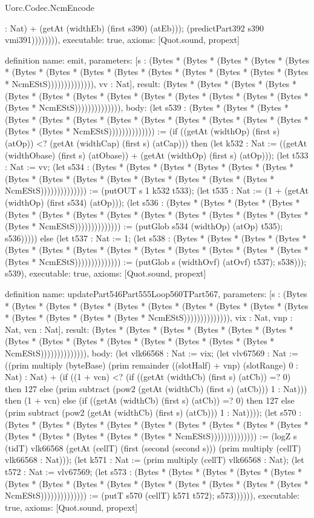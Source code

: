 \begin{lexlean}{Uorc.Codec.NcmEncode}
\begin{semanticmodule}
{: Nat) + (getAt (widthEb) (first s390) (atEb))); (predictPart392 s390 vmi391)))))))),
  executable: true,
  axioms: [Quot.sound, propext]
}

definition{
  name: emit,
  parameters: [s : (Bytes * (Bytes * (Bytes * (Bytes * (Bytes * (Bytes * (Bytes * (Bytes * (Bytes * (Bytes * (Bytes * (Bytes * (Bytes * (Bytes * NcmEStS)))))))))))))), vv : Nat],
  result: (Bytes * (Bytes * (Bytes * (Bytes * (Bytes * (Bytes * (Bytes * (Bytes * (Bytes * (Bytes * (Bytes * (Bytes * (Bytes * (Bytes * NcmEStS)))))))))))))),
  body: (let s539 : (Bytes * (Bytes * (Bytes * (Bytes * (Bytes * (Bytes * (Bytes * (Bytes * (Bytes * (Bytes * (Bytes * (Bytes * (Bytes * (Bytes * NcmEStS)))))))))))))) := (if ((getAt (widthOp) (first s) (atOp)) <? (getAt (widthCap) (first s) (atCap))) then (let k532 : Nat := ((getAt (widthObase) (first s) (atObase)) + (getAt (widthOp) (first s) (atOp))); (let t533 : Nat := vv; (let s534 : (Bytes * (Bytes * (Bytes * (Bytes * (Bytes * (Bytes * (Bytes * (Bytes * (Bytes * (Bytes * (Bytes * (Bytes * (Bytes * (Bytes * NcmEStS)))))))))))))) := (putOUT s 1 k532 t533); (let t535 : Nat := (1 + (getAt (widthOp) (first s534) (atOp))); (let s536 : (Bytes * (Bytes * (Bytes * (Bytes * (Bytes * (Bytes * (Bytes * (Bytes * (Bytes * (Bytes * (Bytes * (Bytes * (Bytes * (Bytes * NcmEStS)))))))))))))) := (putGlob s534 (widthOp) (atOp) t535); s536))))) else (let t537 : Nat := 1; (let s538 : (Bytes * (Bytes * (Bytes * (Bytes * (Bytes * (Bytes * (Bytes * (Bytes * (Bytes * (Bytes * (Bytes * (Bytes * (Bytes * (Bytes * NcmEStS)))))))))))))) := (putGlob s (widthOvf) (atOvf) t537); s538))); s539),
  executable: true,
  axioms: [Quot.sound, propext]
}

definition{
  name: updatePart546Part555Loop560TPart567,
  parameters: [s : (Bytes * (Bytes * (Bytes * (Bytes * (Bytes * (Bytes * (Bytes * (Bytes * (Bytes * (Bytes * (Bytes * (Bytes * (Bytes * (Bytes * NcmEStS)))))))))))))), vix : Nat, vnp : Nat, vcn : Nat],
  result: (Bytes * (Bytes * (Bytes * (Bytes * (Bytes * (Bytes * (Bytes * (Bytes * (Bytes * (Bytes * (Bytes * (Bytes * (Bytes * (Bytes * NcmEStS)))))))))))))),
  body: (let vlk66568 : Nat := vix; (let vlv67569 : Nat := ((prim multiply (byteBase) (prim remainder ((slotHalf) + vnp) (slotRange) 0 : Nat) : Nat) + (if ((1 + vcn) <? (if ((getAt (widthCb) (first s) (atCb)) =? 0) then 127 else (prim subtract (pow2 (getAt (widthCb) (first s) (atCb))) 1 : Nat))) then (1 + vcn) else (if ((getAt (widthCb) (first s) (atCb)) =? 0) then 127 else (prim subtract (pow2 (getAt (widthCb) (first s) (atCb))) 1 : Nat)))); (let s570 : (Bytes * (Bytes * (Bytes * (Bytes * (Bytes * (Bytes * (Bytes * (Bytes * (Bytes * (Bytes * (Bytes * (Bytes * (Bytes * (Bytes * NcmEStS)))))))))))))) := (logZ s (tidT) vlk66568 (getAt (cellT) (first (second (second s))) (prim multiply (cellT) vlk66568 : Nat))); (let k571 : Nat := (prim multiply (cellT) vlk66568 : Nat); (let t572 : Nat := vlv67569; (let s573 : (Bytes * (Bytes * (Bytes * (Bytes * (Bytes * (Bytes * (Bytes * (Bytes * (Bytes * (Bytes * (Bytes * (Bytes * (Bytes * (Bytes * NcmEStS)))))))))))))) := (putT s570 (cellT) k571 t572); s573)))))),
  executable: true,
  axioms: [Quot.sound, propext]
}


\end{semanticmodule}
\end{lexlean}
